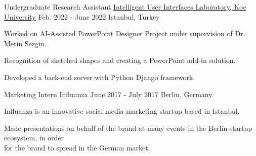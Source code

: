 \begin{cventries}
  \cventry
    {Undergraduate Research Assistant}
    {\href{https://iui.ku.edu.tr}{Intelligent User Interfaces Laboratory, Koc University}}
    {Feb. 2022 - June 2022}
    {Istanbul, Turkey}
    {
      \begin{cvitems}
        \item {Worked on AI-Assisted PowerPoint Designer Project under supervision of Dr. Metin Sezgin.}
        \item {Recognition of sketched shapes and creating a PowerPoint add-in solution.}
        \item {Developed a back-end server with Python Django framework.}
      \end{cvitems}
    }

  \cventry
    {Marketing Intern}
    {Influanza}
    {June 2017 - July 2017}
    {Berlin, Germany}
    {
      \begin{cvitems}
        \item {Influanza is an innovative social media marketing startup based in Istanbul.}
        \item {Made presentations on behalf of the brand at many events in the Berlin startup ecosystem, in order \\ for the brand to spread in the German market.}
      \end{cvitems}
    }


\end{cventries}
